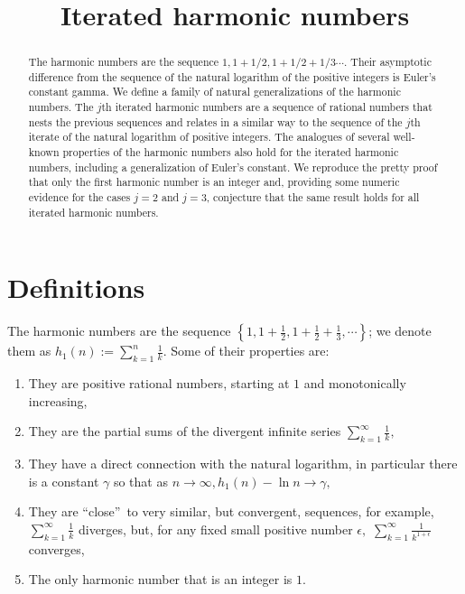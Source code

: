 \documentclass{article}
\theoremstyle{theorem}
\theoremstyle{definition}
\begin{document}
\title{Iterated harmonic numbers}
\author{}%

\maketitle

\begin{abstract}
The harmonic numbers are the sequence $1, 1+1/2, 1+1/2+1/3 \cdots$. Their asymptotic difference
 from the sequence of the natural logarithm of the positive integers is Euler's constant gamma. 
 We define a family of natural generalizations of the harmonic numbers. The $j$th iterated harmonic 
 numbers are a sequence of rational numbers that nests the previous sequences and relates in a similar 
 way to the sequence of the $j$th iterate of the natural logarithm of positive integers. The analogues 
 of several well-known properties of the harmonic numbers also hold for the iterated harmonic numbers, 
 including a generalization of Euler's constant. We reproduce the pretty proof that only the first 
 harmonic number is an integer and, providing some numeric evidence for the cases $j = 2$ and $j = 3$, 
 conjecture that the same result holds for all iterated harmonic numbers.
\end{abstract}

\noindent
\section{Definitions}

The harmonic numbers are the sequence {\small $\left\{ 1,1+\frac{1}{2},1+\frac{1}{2}+%
\frac{1}{3},\cdots \right\} $}; we denote them as $h_{1}\left( n\right)
:=\sum_{k=1}^{n}\frac{1}{k}$. Some of their properties are:

\begin{enumerate}
\item They are positive rational numbers, starting at $1$ and monotonically
increasing,

\item They are the partial sums of the divergent infinite series $%
\sum_{k=1}^{\infty }\frac{1}{k},$

\item They have a direct connection with the natural logarithm, in
particular there is a constant $\gamma $ so that as $n\rightarrow \infty
,h_{1}\left( n\right) -\ln n\rightarrow \gamma ,$

\item They are \textquotedblleft close\textquotedblright\ to very similar,
but convergent, sequences, for example, {\small $\sum_{k=1}^{\infty }\frac{1}{k}$}
diverges, but, for any fixed small positive number $\epsilon ,$ {\small $%
\sum_{k=1}^{\infty }\frac{1}{k^{1+\epsilon }}$} converges,

\item The only harmonic number that is an integer is $1$.
\end{enumerate}
\end{document}
